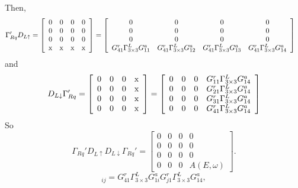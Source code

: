 \documentclass[aps,prb,superscriptaddress]{revtex4-2}
\begin{document}
Then,
\begin{equation}
\begin{split}
\Gamma_{Rq}'D_{L\uparrow} = 
\left[\begin{array}{cccc}
0 & 0 & 0 & 0 \\
0 & 0 & 0 & 0 \\
0 & 0 & 0 & 0 \\
\rm{x} & \rm{x} & \rm{x} & \rm{x}
\end{array}\right]
&= \left[\begin{array}{cccc}
0 & 0 & 0 & 0 \\
0 & 0 & 0 & 0 \\
0 & 0 & 0 & 0 \\
G_{41}^{r}\Gamma_{3\times3}^{L}G_{11}^{a} & G_{41}^{r}\Gamma_{3\times3}^{L}G_{12}^{a} & G_{41}^{r}\Gamma_{3\times3}^{L}G_{13}^{a} & G_{41}^{r}\Gamma_{3\times3}^{L}G_{14}^{a} \\
\end{array}\right]
\end{split}
\end{equation}
and
\begin{equation}
D_{L\downarrow}\Gamma_{Rq}' = 
\left[\begin{array}{cccc}
0 & 0 & 0 & \rm{x} \\
0 & 0 & 0 & \rm{x} \\
0 & 0 & 0 & \rm{x} \\
0 & 0 & 0 & \rm{x}
\end{array}\right] = 
\left[\begin{array}{cccc}
0 & 0 & 0 & G_{11}^{r}\Gamma_{3\times3}^{L}G_{14}^{a}\\
0 & 0 & 0 & G_{21}^{r}\Gamma_{3\times3}^{L}G_{14}^{a} \\
0 & 0 & 0 & G_{31}^{r}\Gamma_{3\times3}^{L}G_{14}^{a} \\
0 & 0 & 0 & G_{41}^{r}\Gamma_{3\times3}^{L}G_{14}^{a} \\
\end{array}\right]
\end{equation}
So 
\begin{equation}
\Gamma_{Rq}'D_{L\uparrow}D_{L\downarrow}\Gamma_{Rq}' = 
\left[\begin{array}{cccc}
0 & 0 & 0 & 0 \\
0 & 0 & 0 & 0 \\
0 & 0 & 0 & 0 \\
0 & 0 & 0 & A(E,\omega)
\end{array}\right].
\end{equation}
\begin{equation}
[A(E, \omega)]_{ij} = G_{41}^{r}\Gamma_{3\times3}^{L}G_{1i}^{a} G_{j1}^{r}\Gamma_{3\times3}^{L}G_{14}^{a},
\end{equation}
\end{document}

